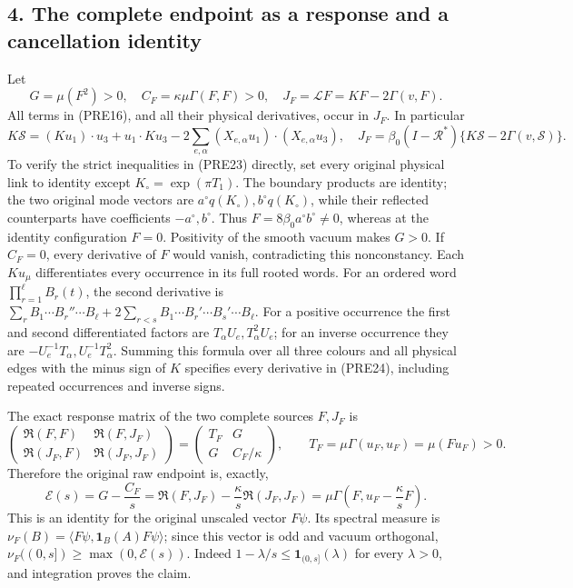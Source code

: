 \documentclass[11pt]{article}
\begin{document}
\subsection*{4. The complete endpoint as a response and a cancellation identity}

Let
\[
 G=\mu(F^2)>0,\quad
 C_F=\kappa\mu\Gamma(F,F)>0,\quad
 J_F=\mathcal LF=KF-2\Gamma(v,F).
 \tag{PRE23}
\]
All terms in (PRE16), and all their physical derivatives, occur in \(J_F\). In particular
\[
 K\mathcal S=(Ku_1)\cdot u_3+u_1\cdot Ku_3
                   -2\sum_{e,\alpha}(X_{e,\alpha}u_1)
                                      \cdot(X_{e,\alpha}u_3),
 \quad
 J_F=\beta_0(I-\mathcal R^*)\{K\mathcal S-2\Gamma(v,\mathcal S)\}.
 \tag{PRE24}
\]
To verify the strict inequalities in (PRE23) directly, set every original physical link to identity except \(K_\circ=\exp(\pi T_1)\). The boundary products are identity; the two original mode vectors are \(a^\circ q(K_\circ),b^\circ q(K_\circ)\), while their reflected counterparts have coefficients \(-a^\circ,b^\circ\). Thus \(F=8\beta_0a^\circ b^\circ\ne0\), whereas at the identity configuration \(F=0\). Positivity of the smooth vacuum makes \(G>0\). If \(C_F=0\), every derivative of \(F\) would vanish, contradicting this nonconstancy.
Each \(Ku_\mu\) differentiates every occurrence in its full rooted words. For an ordered word \(\prod_{r=1}^{\ell}B_r(t)\), the second derivative is
\(\sum_rB_1\cdots B_r''\cdots B_\ell+
2\sum_{r<s}B_1\cdots B_r'\cdots B_s'\cdots B_\ell\).
For a positive occurrence the first and second differentiated factors are \(T_\alpha U_e,T_\alpha^2U_e\); for an inverse occurrence they are \(-U_e^{-1}T_\alpha,U_e^{-1}T_\alpha^2\). Summing this formula over all three colours and all physical edges with the minus sign of \(K\) specifies every derivative in (PRE24), including repeated occurrences and inverse signs.

The exact response matrix of the two complete sources \(F,J_F\) is
\[
 \begin{pmatrix}
 \mathfrak R(F,F)&\mathfrak R(F,J_F)\\
 \mathfrak R(J_F,F)&\mathfrak R(J_F,J_F)
 \end{pmatrix}
 =
 \begin{pmatrix}
 T_F&G\\G&C_F/\kappa
 \end{pmatrix},
 \qquad T_F=\mu\Gamma(u_F,u_F)=\mu(Fu_F)>0.
 \tag{PRE25}
\]
Therefore the original raw endpoint is, exactly,
\[
 \mathscr E(s)=G-\frac{C_F}{s}
 =\mathfrak R(F,J_F)-\frac{\kappa}{s}\mathfrak R(J_F,J_F)
 =\mu\Gamma\left(F,u_F-\frac{\kappa}{s}F\right).
 \tag{PRE26}
\]
This is an identity for the original unscaled vector \(F\psi\). Its spectral measure is \(\nu_F(B)=\langle F\psi,\mathbf1_B(A)F\psi\rangle\); since this vector is odd and vacuum orthogonal,
\(\nu_F((0,s])\ge\max(0,\mathscr E(s))\).
Indeed \(1-\lambda/s\le\mathbf1_{(0,s]}(\lambda)\) for every \(\lambda>0\), and integration proves the claim.
\end{document}
